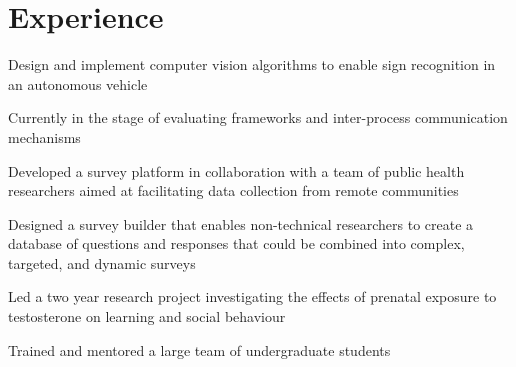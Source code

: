 \documentclass[]{chowes-resume}
\begin{document}
\begin{minipage}[t]{0.66\textwidth} 


\section{Experience}

\vspace{\topsep} %
\begin{tightemize}
\item Design and implement computer vision algorithms to enable sign recognition in an autonomous vehicle
\item Currently in the stage of evaluating frameworks and inter-process communication mechanisms
\end{tightemize}
\sectionsep

\begin{tightemize}
\item Developed a survey platform in collaboration with a team of public health researchers aimed at facilitating data collection from remote communities
\item Designed a survey builder that enables non-technical researchers to create a database of questions and responses that could be combined into complex, targeted, and dynamic surveys

\end{tightemize}
\sectionsep

\begin{tightemize}
\item Led a two year research project investigating the effects of prenatal exposure to testosterone on learning and social behaviour
\item Trained and mentored a large team of undergraduate students
\end{tightemize}
\sectionsep


\end{minipage}
\end{document}
